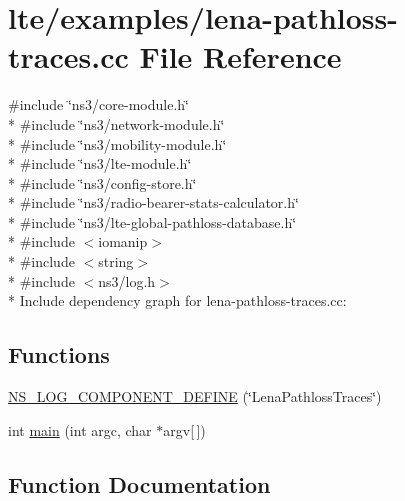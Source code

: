 \hypertarget{lena-pathloss-traces_8cc}{}\section{lte/examples/lena-\/pathloss-\/traces.cc File Reference}
\label{lena-pathloss-traces_8cc}
{\ttfamily \#include \char`\"{}ns3/core-\/module.\+h\char`\"{}}\\*
{\ttfamily \#include \char`\"{}ns3/network-\/module.\+h\char`\"{}}\\*
{\ttfamily \#include \char`\"{}ns3/mobility-\/module.\+h\char`\"{}}\\*
{\ttfamily \#include \char`\"{}ns3/lte-\/module.\+h\char`\"{}}\\*
{\ttfamily \#include \char`\"{}ns3/config-\/store.\+h\char`\"{}}\\*
{\ttfamily \#include \char`\"{}ns3/radio-\/bearer-\/stats-\/calculator.\+h\char`\"{}}\\*
{\ttfamily \#include \char`\"{}ns3/lte-\/global-\/pathloss-\/database.\+h\char`\"{}}\\*
{\ttfamily \#include $<$iomanip$>$}\\*
{\ttfamily \#include $<$string$>$}\\*
{\ttfamily \#include $<$ns3/log.\+h$>$}\\*
Include dependency graph for lena-\/pathloss-\/traces.cc\+:
\subsection*{Functions}
\begin{DoxyCompactItemize}
\item 
\hyperlink{lena-pathloss-traces_8cc_a7f5778837dc2bdbc7426c89b5a92bdaa}{N\+S\+\_\+\+L\+O\+G\+\_\+\+C\+O\+M\+P\+O\+N\+E\+N\+T\+\_\+\+D\+E\+F\+I\+NE} (\char`\"{}Lena\+Pathloss\+Traces\char`\"{})
\item 
int \hyperlink{lena-pathloss-traces_8cc_a0ddf1224851353fc92bfbff6f499fa97}{main} (int argc, char $\ast$argv\mbox{[}$\,$\mbox{]})
\end{DoxyCompactItemize}


\subsection{Function Documentation}
